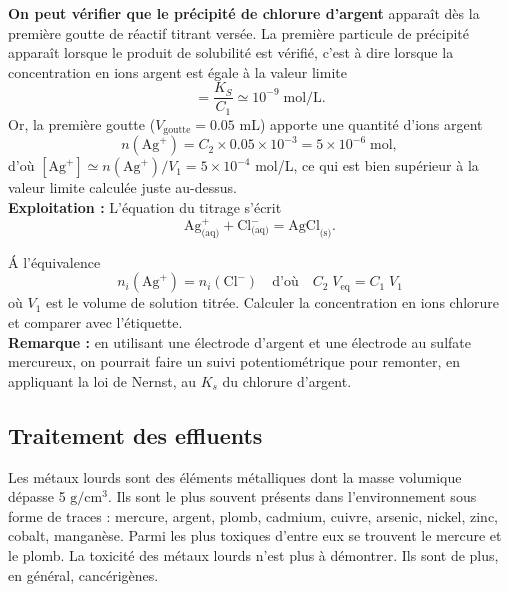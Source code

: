 \documentclass[11pt,a4paper]{report}
\begin{document}
\textbf{On peut vérifier que le précipité de chlorure d'argent} apparaît dès la première goutte de réactif titrant versée. La première particule de précipité apparaît lorsque le produit de solubilité est vérifié, c'est à dire lorsque la concentration en ions argent est égale à la valeur limite
\begin{equation}
	[\text{Ag}^+] = \frac{K_S}{C_1} \simeq 10^{-9}\;\text{mol/L}.
\end{equation}
Or, la première goutte ($V_\text{goutte} = 0.05$ mL) apporte une quantité d'ions argent
\begin{equation}
	n(\text{Ag}^+) = C_2 \times 0.05\times10^{-3} = 5\times10^{-6}\;\text{mol},
\end{equation}
d'où $[\text{Ag}^+] \simeq n(\text{Ag}^+)/V_1 = 5\times10^{-4}$ mol/L, ce qui est bien supérieur à la valeur limite calculée juste au-dessus.\\

\textbf{Exploitation :}
L'équation du titrage s'écrit
\begin{equation}
	\boxed{\text{Ag}^+_\text{(aq)} + \text{Cl}^-_\text{(aq)} = \text{AgCl}_\text{(s)}}.
\end{equation}

\'A l'équivalence
\begin{equation}
	n_i(\text{Ag}^+) = n_i(\text{Cl}^-) \quad\text{d'où}\quad  C_2\;V_\text{eq} = C_1\;V_1
\end{equation} 
où $V_1$ est le volume de solution titrée. Calculer la concentration en ions chlorure et comparer avec l'étiquette.\\ 

\textbf{Remarque :} en utilisant une électrode d'argent et une électrode au sulfate mercureux, on pourrait faire un suivi potentiométrique pour remonter, en appliquant la loi de Nernst, au $K_s$ du chlorure d'argent.

\subsection{Traitement des effluents}

Les métaux lourds sont des éléments métalliques dont la masse volumique dépasse 5 $\text{g}/\text{cm}^3$. Ils sont le plus souvent présents dans l'environnement sous forme de traces : mercure, argent, plomb, cadmium, cuivre, arsenic, nickel, zinc, cobalt, manganèse. Parmi les plus toxiques d'entre eux se trouvent le mercure et le plomb. La toxicité des métaux lourds n'est plus à démontrer. Ils sont de plus, en général, cancérigènes.\\ 
\end{document}
